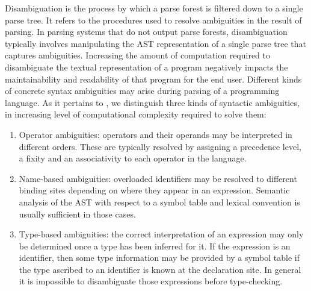 Disambiguation is the process by which a parse forest is filtered down to a single parse tree.
It refers to the procedures used to resolve ambiguities in the result of parsing.
In parsing systems that do not output parse forests, disambiguation typically involves manipulating the \ac{AST} representation of a single parse tree that captures ambiguities.
Increasing the amount of computation required to disambiguate the textual representation of a program negatively impacts the maintainability and readability of that program for the end user.
Different kinds of concrete syntax ambiguities may arise during parsing of a programming language.
As it pertains to \Beluga, we distinguish three kinds of syntactic ambiguities, in increasing level of computational complexity required to solve them:
\begin{enumerate}
\item
Operator ambiguities: operators and their operands may be interpreted in different orders.
These are typically resolved by assigning a precedence level, a fixity and an associativity to each operator in the language.
\item
Name-based ambiguities: overloaded identifiers may be resolved to different binding sites depending on where they appear in an expression.
Semantic analysis of the \ac{AST} with respect to a symbol table and lexical convention is usually sufficient in those cases.
\item
Type-based ambiguities: the correct interpretation of an expression may only be determined once a type has been inferred for it.
If the expression is an identifier, then some type information may be provided by a symbol table if the type ascribed to an identifier is known at the declaration site.
In general it is impossible to disambiguate those expressions before type-checking.
\end{enumerate}



